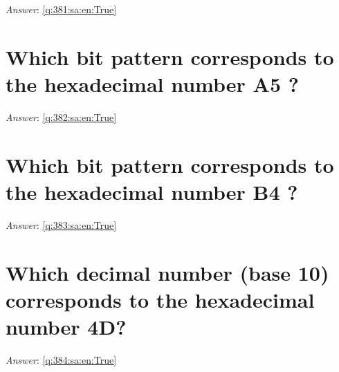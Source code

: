 \documentclass[a4paper,11pt,oneside]{book}
\begin{document}
\begin{sloppypar}
\label{q:381:sa:en:False}

\vspace{2cm}

\noindent\makebox[\textwidth]{\hrulefill}

\vspace{1cm}

\textit{Answer}: \autoref{q:381:sa:en:True}



\section{Which bit pattern corresponds to the hexadecimal number A5 ?}

\label{q:382:sa:en:False}

\vspace{2cm}

\noindent\makebox[\textwidth]{\hrulefill}

\vspace{1cm}

\textit{Answer}: \autoref{q:382:sa:en:True}



\section{Which bit pattern corresponds to the hexadecimal number B4 ?}

\label{q:383:sa:en:False}

\vspace{2cm}

\noindent\makebox[\textwidth]{\hrulefill}

\vspace{1cm}

\textit{Answer}: \autoref{q:383:sa:en:True}



\section{Which decimal number (base 10) corresponds to the hexadecimal number 4D?}

\label{q:384:sa:en:False}

\vspace{2cm}

\noindent\makebox[\textwidth]{\hrulefill}

\vspace{1cm}

\textit{Answer}: \autoref{q:384:sa:en:True}




\end{sloppypar}
\end{document}
